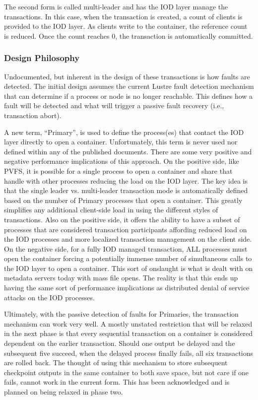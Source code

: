 \documentclass[conference]{IEEEtran}
\begin{document}
The second form is called multi-leader and has the IOD layer manage the
transactions. In this case, when the transaction is created, a count of clients
is provided to the IOD layer. As clients write to the container, the reference
count is reduced. Once the count reaches 0, the transaction is automatically
committed.

\subsubsection{Design Philosophy}
Undocumented, but inherent in the design of these transactions is how faults
are detected. The initial design assumes the current Lustre fault detection
mechanism that can determine if a process or node is no longer reachable. This
defines how a fault will be detected and what will trigger a passive fault
recovery (i.e., transaction abort).

A new term, ``Primary'', is used to define the process(es) that contact the IOD
layer directly to open a container. Unfortunately, this term is never used nor
defined within any of the published documents. There are some very positive and
negative performance implications of this approach. On the positive side, like
PVFS, it is possible for a single process to open a container and share that
handle with other processes reducing the load on the IOD layer. The key idea is
that the single leader vs. multi-leader transaction mode is automatically
defined based on the number of Primary processes that open a container. This
greatly simplifies any additional client-side load in using the different
styles of transactions. Also on the positive side, it offers the ability to
have a subset of processes that are considered transaction participants
affording reduced load on the IOD processes and more localized transaction
management on the client side. On the negative side, for a fully IOD managed
transaction, ALL processes must open the container forcing a potentially
immense number of simultaneous calls to the IOD layer to open a container. This
sort of onslaught is what is dealt with on metadata servers today with mass
file opens. The reality is that this ends up having the same sort of
performance implications as distributed denial of service attacks on the IOD
processes.

Ultimately, with the passive detection of faults for Primaries, the transaction
mechanism can work very well. A mostly unstated restriction that will be
relaxed in the next phase is that every sequential transaction on a container
is considered dependent on the earlier transaction. Should one output be
delayed and the subsequent five succeed, when the delayed process finally
fails, all six transactions are rolled back. The thought of using this
mechanism to store subsequent checkpoint outputs in the same container to both
save space, but not care if one fails, cannot work in the current form. This
has been acknowledged and is planned on being relaxed in phase two.
\end{document}
